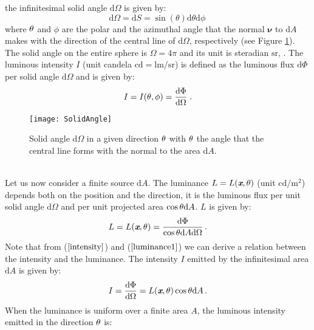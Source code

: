 the infinitesimal solid angle $\textrm{d}\Omega$ is given by:
\begin{equation}\label{solid_angle}
\textrm{d}\Omega = \textrm{d}S= \sin(\theta)\textrm{d}\theta \textrm{d}\phi\,
\end{equation}
 where $\theta$ and $\phi$ are the polar and the azimuthal angle that the normal $\boldsymbol{\nu}$ to $\textrm{d}A$ makes with the direction of the central line of $\textrm{d}\Omega$, respectively (see Figure \ref{fig:rad}).
The solid angle on the entire sphere is $\Omega = 4\pi$ and its unit is steradian $\textrm{sr}$, \cite{arecchi2007field}.
The luminous intensity $I$ (unit candela $\textrm{cd}=\textrm{lm}/\textrm{sr}$) is defined as the luminous flux $\textrm{d}\Phi$ per solid angle
$\textrm{d}\Omega$ and is given by:
\begin{equation}\label{intensity}
I = I(\theta, \phi) = \frac{\textrm{d}\Phi}{\textrm{d}\Omega}\;.
\end{equation}
 \begin{figure}[h]
  \begin{center}
  \texttt{[image: SolidAngle]}
  \end{center}
  \caption{Solid angle $\textrm{d}\Omega$ in a given direction $\theta$ with $\theta$ the angle that the central line forms with the normal to the area $\textrm{d}A$.}
  \label{fig:rad}
  \end{figure}
\\ \indent Let us now consider a finite source $\textrm{d}A$.
The luminance $L = L(\textit{\textbf{x}}, \theta)$ (unit $\textrm{cd} / \textrm{m}^2$) depends both on the position and the direction, it is the luminous flux per unit solid angle $\textrm{d}\Omega$ and  per unit projected area $\cos\theta \textrm{d}A$.  $L$  is given by:
\begin{equation}\label{luminance1}
  L=L(\textit{\textbf{x}}, \theta) = \frac{\textrm{d}\Phi}{\cos\theta\textrm{d}A\textrm{d}\Omega}\,.
\end{equation}
\noindent Note that from ($\ref{intensity}$) and ($\ref{luminance1}$) we can derive a relation between the intensity and the luminance. 
The intensity $I$ emitted by the infinitesimal area $\textrm{d}A$ is given by:
\begin{equation}
I = \frac{\textrm{d}\Phi}{\textrm{d}\Omega}= L(\textit{\textbf{x}},\theta)\cos\theta\textrm{d}A \,.
\end{equation}
When the luminance is uniform over a finite area $A$, the luminous intensity emitted in the direction $\theta$ is:
